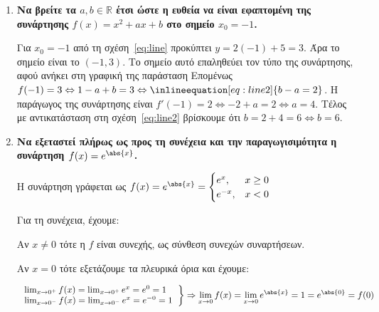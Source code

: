 


\everymath{\displaystyle}
\pagestyle{askhseis}



\begin{center}
  \minibox{\large \bfseries \textcolor{Col1}{Ασκήσεις στις Παραγώγους}}
\end{center}

\vspace{\baselineskip}

\begin{enumerate}
	\item {\bfseries \boldmath Να βρείτε τα $ a, b \in \mathbb{R} $ έτσι ώστε η ευθεία
		να είναι εφαπτομένη της συνάρτησης $ f(x) = x^{2} + ax + b $ στο
	σημείο $ x_{0} = -1 $.} 

  \begin{solution}
		Για $ x_{0} = -1 $ από τη σχέση~\eqref{eq:line}  προκύπτει $ y = 2(-1) + 5 =
		3$. Άρα το σημείο είναι το $ (-1,3) $. Το σημείο αυτό επαληθεύει τον
		τύπο της συνάρτησης, αφού ανήκει στη γραφική της παράσταση
		Επομένως $ f(-1) = 3 \Leftrightarrow 1 - a + b = 3
		\Leftrightarrow \inlineequation[eq:line2]{b - a = 2} $. 
		Η παράγωγος της συνάρτησης είναι $ f'(-1) = 2 \Leftrightarrow -2 + a = 2
		\Leftrightarrow a = 4$. Τέλος με αντικατάσταση στη
		σχέση~\eqref{eq:line2} βρίσκουμε ότι $ b = 2 + 4 = 6 \Leftrightarrow b=6
		$.
  \end{solution}


	\item {\bfseries \boldmath Να εξεταστεί πλήρως ως προς τη συνέχεια και την παραγωγισιμότητα η
		συνάρτηση $ f(x) = e^{\abs{x}} $.}

    \begin{solution}

		Η συνάρτηση γράφεται ως $ f(x) = e^{\abs{x}} = \begin{cases}
				e^{x}, & x\geq 0 \\
				e^{-x}, & x < 0 
			\end{cases}$	
		
		Για τη συνέχεια, έχουμε:

		Αν $ x\neq 0 $ τότε η $f$ είναι συνεχής, ως σύνθεση συνεχών συναρτήσεων.

		Αν $ x = 0 $ τότε εξετάζουμε τα πλευρικά όρια και έχουμε:

		\[
		\left.
		\begin{tabular}{l}
			$\lim_{x\to 0^{+}} f(x) = \lim_{x\to 0^{+}} e^{x} =  e^{0} = 1$ \\ 
			$\lim_{x\to 0^{-}} f(x) = \lim_{x\to 0^{-}} e^{x} = e^{-0} = 1$
		\end{tabular}
		\right\}
		\Rightarrow \lim_{x\to 0} f(x) = \lim_{x\to 0} e^{\abs{x}} = 1 = e^{\abs{0}} = f(0) 
		\]


\end{solution}
\end{enumerate}
